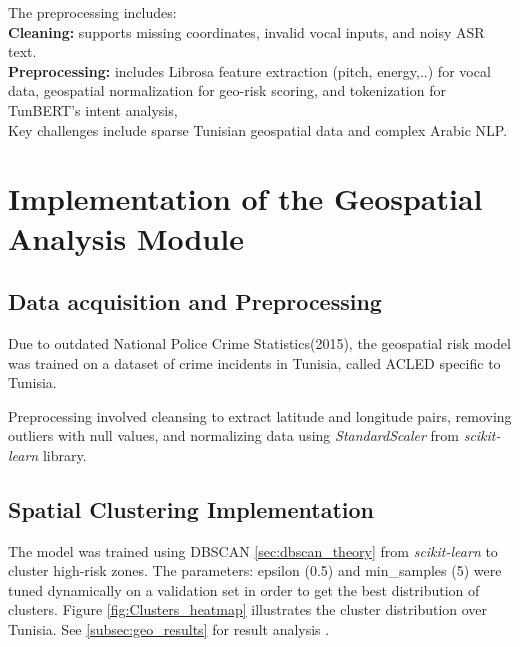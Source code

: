 \documentclass[12pt,a4paper,oneside,english]{book}
\begin{document}
The preprocessing includes: \\
\textbf{Cleaning:} supports missing coordinates, invalid vocal inputs, and noisy ASR text.\\
\textbf{Preprocessing:} includes Librosa feature extraction (pitch, energy,..) for vocal data, geospatial normalization for geo-risk scoring, and tokenization for TunBERT's intent analysis, 
\\  Key challenges include sparse Tunisian geospatial data and complex Arabic NLP.



\section{Implementation of the Geospatial Analysis Module}
\label{geospatial_implementation}
\subsection{Data acquisition and Preprocessing}
Due to outdated National Police Crime Statistics(2015), the geospatial risk model was trained on a dataset of crime incidents in Tunisia, called ACLED \cite{raleigh2010acled} specific to Tunisia.

Preprocessing involved cleansing to extract latitude and longitude pairs, removing outliers with null values, and normalizing data using \textit{StandardScaler} from \textit{scikit-learn} library.
\subsection{Spatial Clustering Implementation}
The model was trained using DBSCAN \ref{sec:dbscan_theory} from \textit{scikit-learn} to cluster high-risk zones. 
The parameters: epsilon (0.5) and min\_samples (5) were tuned dynamically on a validation set in order to get the best distribution of clusters.
Figure \ref{fig:Clusters_heatmap} illustrates the cluster distribution over Tunisia. See \ref{subsec:geo_results} for result analysis .
\end{document}
